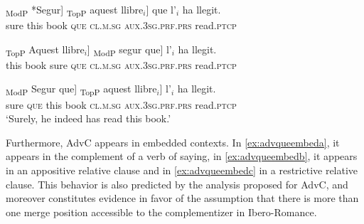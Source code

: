  \gll   {\ob}\textsubscript{ModP} *Segur]  {\ob}\textsubscript{TopP}  aquest llibre$_i$] {que}  l'$_i$ ha llegit. \\
		{} sure  {} this book \textsc{que} \textsc{cl.m.sg} \textsc{aux.3sg.prf.prs} read.\textsc{ptcp}\\
		\ex \label{ex:clldadvcb}

		\gll   {\ob}\textsubscript{TopP} Aquest llibre$_i$]  {\ob}\textsubscript{ModP} segur  que]  l'$_i$ ha llegit. \\
		{} this book  {} sure \textsc{que} \textsc{cl.m.sg} \textsc{aux.3sg.prf.prs} read.\textsc{ptcp}\\
	
		\ex\label{ex:clldadvcc} 

		\gll   {\ob}\textsubscript{ModP} Segur  {que}] {\ob}\textsubscript{TopP}  aquest llibre$_i$] l'$_i$ ha llegit. \\
		{} sure \textsc{que} {} this book \textsc{cl.m.sg} \textsc{aux.3sg.prf.prs} read.\textsc{ptcp}\\
		\glt `Surely, he indeed has read this book.'
		\z
\z




Furthermore, AdvC appears in embedded contexts. In \eqref{ex:advqueembeda}, it appears in the complement of a verb of saying, in \eqref{ex:advqueembedb}, it appears in an appositive relative clause and in \eqref{ex:advqueembedc} in a restrictive relative clause.  This behavior  is also predicted by the analysis proposed for AdvC, and moreover constitutes  evidence in favor of the assumption that there is more than one  merge position accessible to the  complementizer in Ibero-Romance. 

